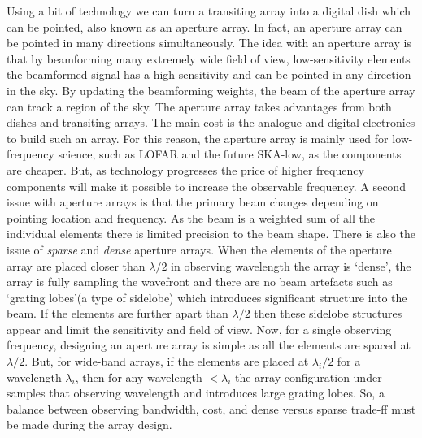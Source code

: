 \documentclass[usenatbib,usegraphicx]{article}
\begin{document}
Using a bit of technology we can turn a transiting array into a digital dish which can be pointed, also known as an aperture array.
In fact, an aperture array can be pointed in many directions simultaneously.
The idea with an aperture array is that by beamforming many extremely wide field of view, low-sensitivity elements the beamformed signal has a high sensitivity and can be pointed in any direction in the sky.
By updating the beamforming weights, the beam of the aperture array can track a region of the sky.
The aperture array takes advantages from both dishes and transiting arrays.
The main cost is the analogue and digital electronics to build such an array.
For this reason, the aperture array is mainly used for low-frequency science, such as LOFAR and the future SKA-low, as the components are cheaper.
But, as technology progresses the price of higher frequency components will make it possible to increase the observable frequency.
A second issue with aperture arrays is that the primary beam changes depending on pointing location and frequency.
As the beam is a weighted sum of all the individual elements there is limited precision to the beam shape.
There is also the issue of \emph{sparse} and \emph{dense} aperture arrays.
When the elements of the aperture array are placed closer than $\lambda/2$ in observing wavelength the array is `dense', the array is fully sampling the wavefront and there are no beam artefacts such as `grating lobes'(a type of sidelobe) which introduces significant structure into the beam.
If the elements are further apart than $\lambda/2$ then these sidelobe structures appear and limit the sensitivity and field of view.
Now, for a single observing frequency, designing an aperture array is simple as all the elements are spaced at $\lambda/2$.
But, for wide-band arrays, if the elements are placed at $\lambda_i/2$ for a wavelength $\lambda_i$, then for any wavelength $< \lambda_i$ the array configuration under-samples that observing wavelength and introduces large grating lobes.
So, a balance between observing bandwidth, cost, and dense versus sparse trade-ff must be made during the array design.
\label{lastpage}
\end{document}
